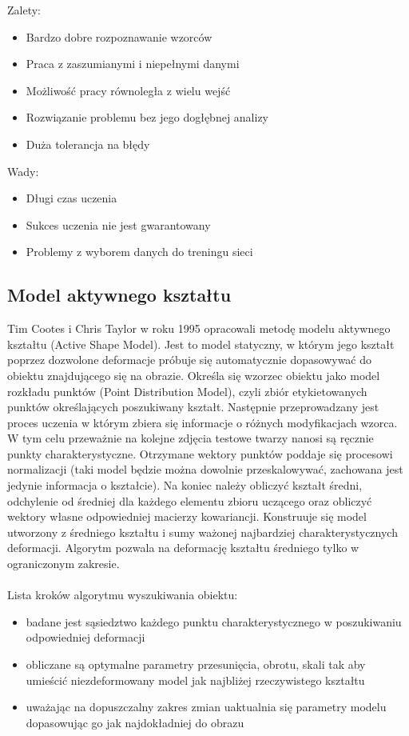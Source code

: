 \documentclass[11pt,a4paper]{article}
\begin{document}
\noindent 
Zalety:
\begin{itemize}
\item  Bardzo dobre rozpoznawanie wzorców
\item  Praca z zaszumianymi i niepełnymi danymi
\item  Możliwość pracy równoległa z wielu wejść
\item  Rozwiązanie problemu bez jego dogłębnej analizy
\item  Duża tolerancja na błędy
\end{itemize}

\noindent 
Wady:
\begin{itemize}
\item  Długi czas uczenia 
\item  Sukces uczenia nie jest gwarantowany 
\item  Problemy z wyborem danych do treningu sieci 
\end{itemize}

\subsection{Model aktywnego kształtu}
Tim Cootes i Chris Taylor w roku 1995 opracowali metodę modelu aktywnego kształtu (Active Shape Model). Jest to model statyczny, w którym jego kształt poprzez dozwolone deformacje próbuje się automatycznie dopasowywać do obiektu znajdującego się na obrazie. Określa się wzorzec obiektu jako model rozkładu punktów (Point Distribution Model), czyli zbiór etykietowanych punktów określających poszukiwany kształt. Następnie przeprowadzany jest proces uczenia w którym zbiera się informacje o różnych modyfikacjach wzorca. W tym celu przeważnie na kolejne zdjęcia testowe twarzy nanosi są ręcznie punkty charakterystyczne. Otrzymane wektory punktów poddaje się procesowi normalizacji (taki model będzie można dowolnie przeskalowywać, zachowana jest jedynie informacja o kształcie). Na koniec należy obliczyć kształt średni, odchylenie od średniej dla każdego elementu zbioru uczącego oraz obliczyć wektory własne odpowiedniej macierzy kowariancji. Konstruuje się model utworzony z średniego kształtu i sumy ważonej najbardziej charakterystycznych deformacji. Algorytm pozwala na deformację kształtu średniego tylko w ograniczonym zakresie.\\
\\
\noindent
Lista kroków algorytmu wyszukiwania obiektu:
\begin{itemize}
\item badane jest sąsiedztwo każdego punktu charakterystycznego w poszukiwaniu odpowiedniej deformacji
\item obliczane są optymalne parametry przesunięcia, obrotu, skali tak aby umieścić niezdeformowany model jak najbliżej rzeczywistego kształtu
\item uważając na dopuszczalny zakres zmian uaktualnia się parametry modelu dopasowując go jak najdokładniej do obrazu
\end{itemize}
\end{document}
